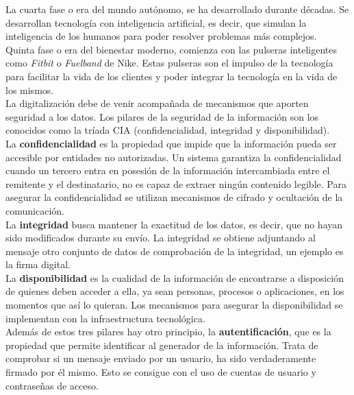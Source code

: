 La cuarta fase o era del mundo autónomo, se ha desarrollado durante décadas. Se desarrollan tecnología con inteligencia artificial, es decir, que simulan la inteligencia de los humanos para poder resolver problemas más complejos.\\

Quinta fase o era del bienestar moderno, comienza con las pulseras inteligentes como \textit{Fitbit} o \textit{Fuelband} de Nike. Estas pulseras son el impulso de la tecnología para facilitar la vida de los clientes y poder integrar la tecnología en la vida de los mismos.\\

La digitalización debe de venir acompañada de mecanismos que aporten seguridad a los datos. Los pilares de la seguridad de la información son los conocidos como la tríada CIA (confidencialidad, integridad y  disponibilidad)\cite{servicios-seguridad}.\\

La \textbf{confidencialidad} es la propiedad que impide que la información pueda ser accesible por entidades no autorizadas. Un sistema garantiza la confidencialidad cuando un tercero entra en posesión de la información intercambiada entre el remitente y el destinatario, no es capaz de extraer ningún contenido legible. Para asegurar la confidencialidad se utilizan mecanismos de cifrado y ocultación de la comunicación.\\

La \textbf{integridad} busca mantener la exactitud de los datos, es decir, que no hayan sido modificados durante su envío. La integridad se obtiene adjuntando al mensaje otro conjunto de datos de comprobación de la integridad, un ejemplo es la firma digital.\\

La \textbf{disponibilidad} es la cualidad de la información de encontrarse a disposición de quienes deben acceder a ella, ya sean personas, procesos o aplicaciones, en los momentos que así lo quieran. Los mecanismos para asegurar la disponibilidad se implementan con la infraestructura tecnológica.\\

Además de estos tres pilares hay otro principio, la \textbf{autentificación}, que es la propiedad que permite identificar al generador de la información. Trata de comprobar si un mensaje enviado por un usuario, ha sido verdaderamente firmado por él mismo. Esto se consigue con el uso de cuentas de usuario y contraseñas de acceso.\\

